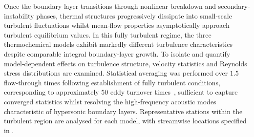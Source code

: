 Once the boundary layer transitions through nonlinear breakdown and secondary-instability phases, thermal structures progressively dissipate into small-scale turbulent fluctuations whilst mean-flow properties asymptotically approach turbulent equilibrium values. In this fully turbulent regime, the three thermochemical models exhibit markedly different turbulence characteristics despite comparable integral boundary-layer growth. To isolate and quantify model-dependent effects on turbulence structure, velocity statistics and Reynolds stress distributions are examined. Statistical averaging was performed over $1.5$ flow-through times following establishment of fully turbulent conditions, corresponding to approximately 50 eddy turnover times~\citep{Pirozzoli2004}, sufficient to capture converged statistics whilst resolving the high-frequency acoustic modes characteristic of hypersonic boundary layers. Representative stations within the turbulent region are analysed for each model, with streamwise locations specified in .




